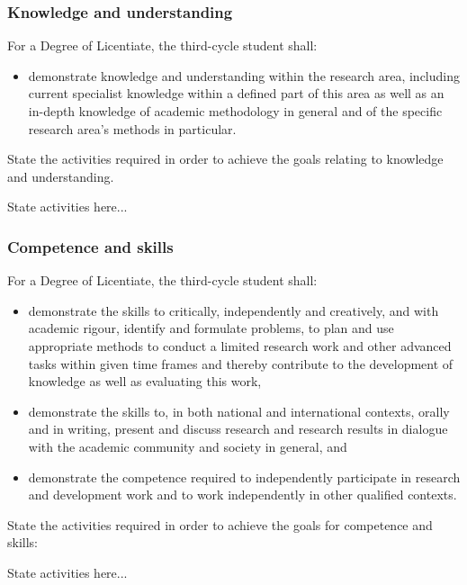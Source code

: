 \subsubsection*{Knowledge and understanding}
For a Degree of Licentiate, the third-cycle student shall:
\begin{itemize}
	\item demonstrate knowledge and understanding within the research area, including current specialist knowledge within a defined part of this area as well as an in-depth knowledge of academic methodology in general and of the specific research area's methods in particular.
\end{itemize}
State the activities required in order to achieve the goals relating to knowledge and understanding.

\colorbox{lgray}{
\begin{minipage}[t]{\textwidth}

State activities here...

\end{minipage}}

\subsubsection*{Competence and skills}
For a Degree of Licentiate, the third-cycle student shall:
\begin{itemize}
	\item demonstrate the skills to critically, independently and creatively, and with academic rigour, identify and formulate problems, to plan and use appropriate methods to conduct a limited research work and other advanced tasks within given time frames and thereby contribute to the development of knowledge as well as evaluating this work,
	\item demonstrate the skills to, in both national and international contexts, orally and in writing, present and discuss research and research results in dialogue with the academic community and society in general, and
	\item demonstrate the competence required to independently participate in research and development work and to work independently in other qualified contexts.
\end{itemize}

State the activities required in order to achieve the goals for competence and skills:

\colorbox{lgray}{
\begin{minipage}[t]{\textwidth}

State activities here...

\end{minipage}}


